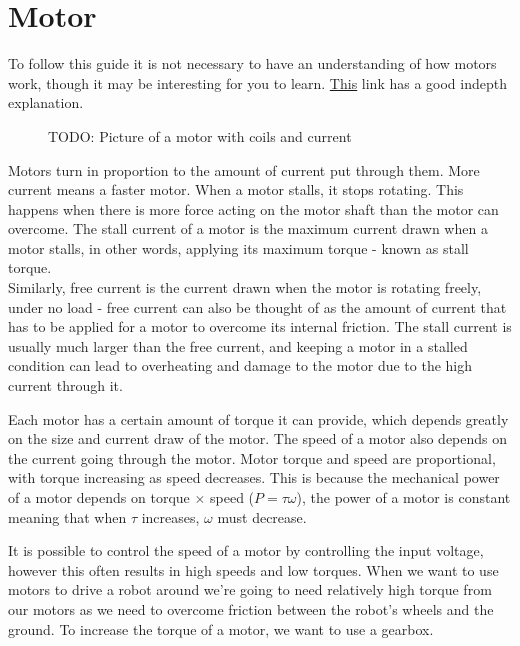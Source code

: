 \documentclass[../TinyBot.tex]{subfiles}
\begin{document}
    
\section{Motor} \label{sec:motor}

To follow this guide it is not necessary to have an understanding of how motors work, though it may be interesting for you to learn. \href{https://www.explainthatstuff.com/electricmotors.html}{This} link has a good indepth explanation. 

\bigskip

\begin{figure}[h!]
    \centering
    \caption{TODO: Picture of a motor with coils and current}
\end{figure}

Motors turn in proportion to the amount of current put through them. More current means a faster motor. 
When a motor stalls, it stops rotating. This happens when there is more force acting on the motor shaft than the motor can overcome. The stall current of a motor is the maximum current drawn when a motor stalls, in other words, applying its maximum torque - known as stall torque. \\

Similarly, free current is the current drawn when the motor is rotating freely, under no load - free current can also be thought of as the amount of current that has to be applied for a motor to overcome its internal friction. The stall current is usually much larger than the free current, and keeping a motor in a stalled condition can lead to overheating and damage to the motor due to the high current through it. 

\bigskip



Each motor has a certain amount of torque it can provide, which depends greatly on the size and current draw of the motor. The speed of a motor also depends on the current going through the motor. Motor torque and speed are proportional, with torque increasing as speed decreases. This is because the mechanical power of a motor depends on torque $\times$ speed ($P=\tau \omega$), the power of a motor is constant meaning that when $\tau$ increases, $\omega$ must decrease. 
\bigskip

It is possible to control the speed of a motor by controlling the input voltage, however this often results in high speeds and low torques. When we want to use motors to drive a robot around we're going to need relatively high torque from our motors as we need to overcome friction between the robot's wheels and the ground. To increase the torque of a motor, we want to use a gearbox. 
\end{document}
